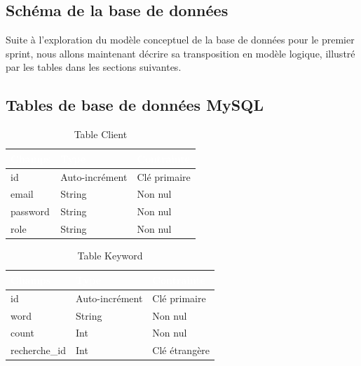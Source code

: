 \newpage
\subsection{Schéma de la base de données}
\noindent
Suite à l'exploration du modèle conceptuel de la base de données pour le premier
sprint, nous allons maintenant décrire sa transposition en modèle logique, illustré par les tables dans les sections suivantes.

\subsection{Tables de base de données MySQL}
\begin{table}[H]
	\centering
	\Large
	\begin{tabular}{|p{4cm}|p{4cm}|p{4cm}|}
		\hline
		\rowcolor{blue!50} \textcolor{white}{Champs} & \textcolor{white}{Type} & \textcolor{white}{Contrainte} \\
		\hline
		id                                           & Auto-incrément          & Clé primaire                  \\ \hline
		email                                        & String                  & Non nul                       \\ \hline
		password                                     & String                  & Non nul                       \\ \hline
		role                                         & String                  & Non nul                       \\ \hline
	\end{tabular}
	\caption{Table Client}
	\label{tab:table_client}
\end{table}

\begin{table}[H]
	\centering
	\Large
	\begin{tabular}{|p{4cm}|p{4cm}|p{4cm}|}
		\hline
		\rowcolor{blue!50} \textcolor{white}{Champs} & \textcolor{white}{Type} & \textcolor{white}{Contrainte}                   \\
		\hline
		id                                           & Auto-incrément          & Clé primaire                                    \\ \hline
		word                                         & String                  & Non nul                                         \\ \hline
		count                                        & Int                     & Non nul                                         \\ \hline
		recherche\_id                                 & Int                     & Clé étrangère  \\ \hline
	\end{tabular}
	\caption{Table Keyword}
	\label{tab:table_keyword}
\end{table}

